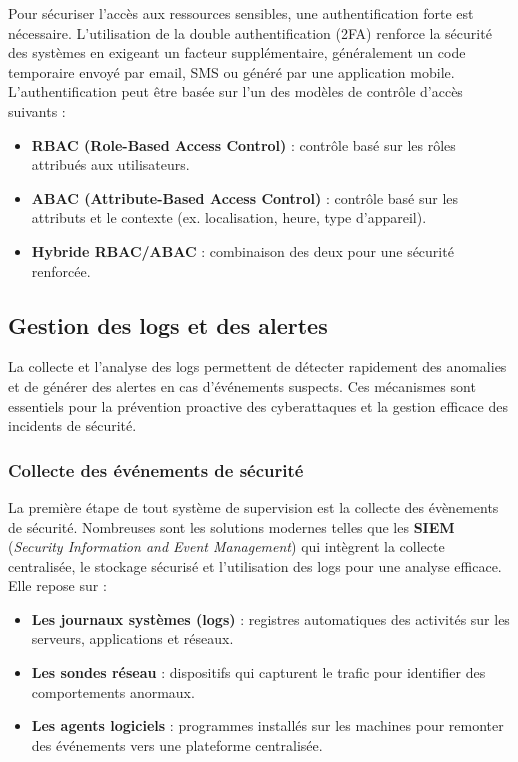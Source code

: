 \documentclass[a4paper,12pt]{report}
\begin{document}
    Pour sécuriser l’accès aux ressources sensibles, une authentification forte est nécessaire. L’utilisation de la double authentification (2FA) renforce la sécurité des systèmes \cite{nist} en exigeant un facteur supplémentaire, généralement un code temporaire envoyé par email, SMS ou généré par une application mobile. L'authentification peut être basée sur l'un des modèles de contrôle d'accès suivants :
    
    \begin{itemize}
        \item \textbf{RBAC (Role-Based Access Control)} : contrôle basé sur les rôles attribués aux utilisateurs.
        \item \textbf{ABAC (Attribute-Based Access Control)} : contrôle basé sur les attributs et le contexte (ex. localisation, heure, type d’appareil).
        \item \textbf{Hybride RBAC/ABAC} : combinaison des deux pour une sécurité renforcée.
    \end{itemize}
    
    \subsection{Gestion des logs et des alertes}
    
    La collecte et l’analyse des logs permettent de détecter rapidement des anomalies et de générer des alertes en cas d’événements suspects. Ces mécanismes sont essentiels pour la prévention proactive des cyberattaques et la gestion efficace des incidents de sécurité.
    
    \subsubsection{Collecte des événements de sécurité}
    
    La première étape de tout système de supervision est la collecte des évènements de sécurité. Nombreuses sont les solutions modernes telles que les \textbf{SIEM} (\textit{Security Information and Event Management}) \cite{ibm_siem} qui intègrent la collecte centralisée, le stockage sécurisé et l'utilisation des logs pour une analyse efficace. Elle repose sur :
    
    \begin{itemize}
        \item \textbf{Les journaux systèmes (logs)} : registres automatiques des activités sur les serveurs, applications et réseaux.
        \item \textbf{Les sondes réseau} : dispositifs qui capturent le trafic pour identifier des comportements anormaux.
        \item \textbf{Les agents logiciels} : programmes installés sur les machines pour remonter des événements vers une plateforme centralisée.
    \end{itemize}
    
\end{document}
